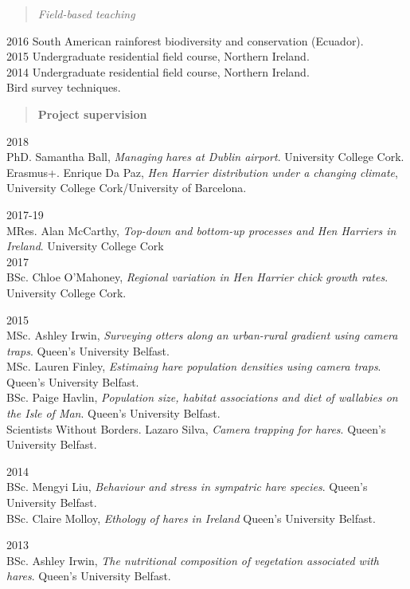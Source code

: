 \documentclass[]{article}
\begin{document}
\begin{quote}
\emph{Field-based teaching}
\end{quote}

2016 South American rainforest biodiversity and conservation
(Ecuador).\\
2015 Undergraduate residential field course, Northern Ireland.\\
2014 Undergraduate residential field course, Northern Ireland.\\
Bird survey techniques.

\begin{quote}
\textbf{Project supervision}
\end{quote}

2018\\
PhD. Samantha Ball, \emph{Managing hares at Dublin airport}. University
College Cork.\\
Erasmus+. Enrique Da Paz, \emph{Hen Harrier distribution under a
changing climate}, University College Cork/University of Barcelona.

2017-19\\
MRes. Alan McCarthy, \emph{Top-down and bottom-up processes and Hen
Harriers in Ireland}. University College Cork\\
2017\\
BSc. Chloe O'Mahoney, \emph{Regional variation in Hen Harrier chick
growth rates}. University College Cork.

2015\\
MSc. Ashley Irwin, \emph{Surveying otters along an urban-rural gradient
using camera traps}. Queen's University Belfast.\\
MSc. Lauren Finley, \emph{Estimaing hare population densities using
camera traps}. Queen's University Belfast.\\
BSc. Paige Havlin, \emph{Population size, habitat associations and diet
of wallabies on the Isle of Man}. Queen's University Belfast.\\
Scientists Without Borders. Lazaro Silva, \emph{Camera trapping for
hares}. Queen's University Belfast.

2014\\
BSc. Mengyi Liu, \emph{Behaviour and stress in sympatric hare species}.
Queen's University Belfast.\\
BSc. Claire Molloy, \emph{Ethology of hares in Ireland} Queen's
University Belfast.

2013\\
BSc. Ashley Irwin, \emph{The nutritional composition of vegetation
associated with hares}. Queen's University Belfast.
\end{document}
